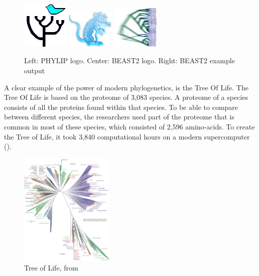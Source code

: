\begin{figure}[H]
  \includegraphics[width=0.2\textwidth]{phylip.png}
  \includegraphics[width=0.2\textwidth]{beast_logo.png}
  \includegraphics[width=0.2\textwidth]{DensiTreeExample2.jpg}
  \caption{
    Left: PHYLIP logo. 
    Center: BEAST2 logo.
    Right: BEAST2 example output
  }
  \label{fig:beast2}
\end{figure}

A clear example of the power of modern phylogenetics,
is the Tree Of Life.
The Tree Of Life is based on the proteome of 3,083 species.
A proteome of a species consists of all the proteins found within that species.
To be able to compare between different species, the researchers
used part of the proteome that is common in most of these species,
which consisted of 2,596 amino-acids.
To create the Tree of Life, it took 3,840 computational hours on a modern 
supercomputer (\cite{hug2016new}).

\begin{figure}[H]
  \includegraphics[width=0.4\textwidth]{tree_of_life_2016.jpg}
  \caption{
    Tree of Life, from \cite{hug2016new}
 }
  \label{fig:tree_of_life}
\end{figure}

